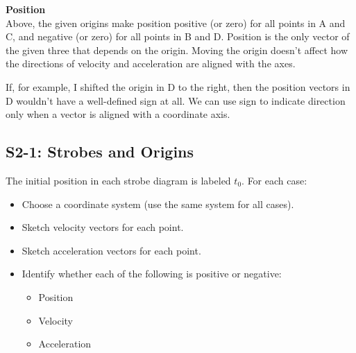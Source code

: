 \documentclass[]{article}
\begin{document}
\begin{TeacherMargin}
\noindent\textbf{Position} \\
Above, the given origins make position positive (or zero) for all points in A and C, and negative (or zero) for all points in B and D. Position is the only vector of the given three that depends on the origin. Moving the origin doesn't affect how the directions of velocity and acceleration are aligned with the axes.

If, for example, I shifted the origin in D to the right, then the position vectors in D wouldn't have a well-defined sign at all. We can use sign to indicate direction only when a vector is aligned with a coordinate axis.
\end{TeacherMargin}
\begin{PresentSpace}
\vspace{-10pt}
\section*{S2-1: Strobes and Origins}
\vspace{-10pt}
The initial position in each strobe diagram is labeled $t_{0}$. For each case:
\begin{multicols}{2}
\begin{itemize}
	\item Choose a coordinate system (use the same system for all cases).
	\vspace{10pt}
	\item Sketch velocity vectors for each point.
	\item Sketch acceleration vectors for each point.
	\item Identify whether each of the following is positive or negative:
	\begin{itemize}
		\item Position
		\item Velocity
		\item Acceleration
	\end{itemize}
\end{itemize}
\begin{center}
\end{center}
\end{multicols}
\end{PresentSpace}
\end{document}
